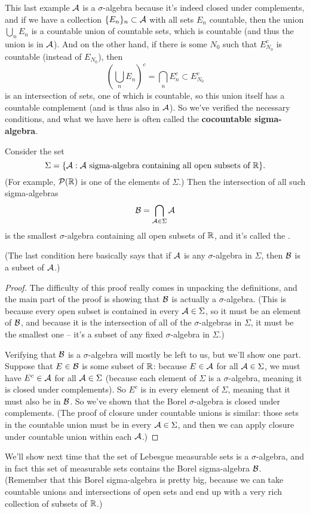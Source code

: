 This last example $\mathcal{A}$ is a $\sigma$-algebra because it's indeed closed under complements, and if we have a collection $\{E_n\}_n \subset \mathcal{A}$ with all sets $E_n$ countable, then the union $\bigcup_{n} E_n$ is a countable union of countable sets, which is countable (and thus the union is in $\mathcal{A}$). And on the other hand, if there is some $N_0$ such that $E_{N_0}^c$ is countable (instead of $E_{N_0}$), then
\[
    \left(\bigcup_n E_n\right)^c = \bigcap_{n} E_n^c \subset E_{N_0}^c
\]  
is an intersection of sets, one of which is countable, so this union itself has a countable complement (and is thus also in $\mathcal{A}$). So we've verified the necessary conditions, and what we have here is often called the \textbf{cocountable sigma-algebra}.

\begin{proposition}
Consider the set 
\[
    \Sigma = \{\mathcal{A}: \mathcal{A} \text{ sigma-algebra containing all open subsets of }\mathbb R\}.
\]
(For example, $\mathcal{P}(\mathbb R)$ is one of the elements of $\Sigma$.) Then the intersection of all such sigma-algebras
\[
    \mathcal{B} = \bigcap_{\mathcal{A} \in \Sigma} \mathcal{A}
\]
is the smallest $\sigma$-algebra containing all open subsets of $\mathbb R$, and it's called the .
\end{proposition}

(The last condition here basically says that if $\mathcal{A}$ is any $\sigma$-algebra in $\Sigma$, then $\mathcal{B}$ is a subset of $\mathcal{A}$.)

\begin{proof}
The difficulty of this proof really comes in unpacking the definitions, and the main part of the proof is showing that $\mathcal{B}$ is actually a $\sigma$-algebra. (This is because every open subset is contained in every $\mathcal{A} \in \Sigma$, so it must be an element of $\mathcal{B}$, and because it is the intersection of all of the $\sigma$-algebras in $\Sigma$, it must be the smallest one -- it's a subset of any fixed $\sigma$-algebra in $\Sigma$.)

Verifying that $\mathcal{B}$ is a $\sigma$-algebra will mostly be left to us, but we'll show one part. Suppose that $E \in \mathcal{B}$ is some subset of $\mathbb R$: because $E \in \mathcal{A}$ for all $\mathcal{A} \in \Sigma$, we must have $E^c \in \mathcal{A}$ for all $\mathcal{A} \in \Sigma$ (because each element of $\Sigma$ is a $\sigma$-algebra, meaning it is closed under complements). So $E^c$ is in every element of $\Sigma$, meaning that it must also be in $\mathcal{B}$. So we've shown that the Borel $\sigma$-algebra is closed under complements. (The proof of closure under countable unions is similar: those sets in the countable union must be in every $\mathcal{A} \in \Sigma$, and then we can apply closure under countable union within each $\mathcal{A}$.)
\end{proof}

We'll show next time that the set of Lebesgue measurable sets is a $\sigma$-algebra, and in fact this set of measurable sets contains the Borel sigma-algebra $\mathcal{B}$. (Remember that this Borel sigma-algebra is pretty big, because we can take countable unions and intersections of open sets and end up with a very rich collection of subsets of $\mathbb R$.)